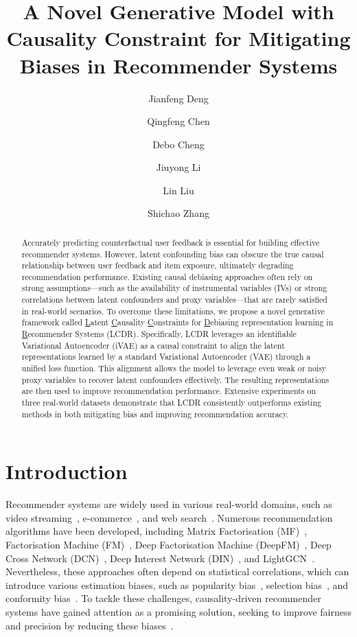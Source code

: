 \documentclass[sigconf]{acmart}
\author{Jianfeng Deng}
\affiliation{%
  \institution{Guangxi University}
  \city{Nanning}
  \country{China}
}
\author{Qingfeng Chen}
\affiliation{%
  \institution{Guangxi University}
  \city{Nanning}
  \country{China}
}
\author{Debo Cheng}
\affiliation{%
  \institution{University of South Australia}
  \city{Adelaide}
  \country{Australia}
}
\author{Jiuyong Li}
\affiliation{%
  \institution{University of South Australia}
  \city{Adelaide}
  \country{Australia}
}
\author{Lin Liu}
\affiliation{%
  \institution{University of South Australia}
  \city{Adelaide}
  \country{Australia}
}
\author{Shichao Zhang}
\affiliation{%
  \institution{Guangxi Normal University}
  \city{Nanning}
  \country{China}
}
\begin{document}
\title{A Novel Generative Model with Causality Constraint for Mitigating Biases in Recommender Systems}


\begin{abstract}
Accurately predicting counterfactual user feedback is essential for building effective recommender systems. However, latent confounding bias can obscure the true causal relationship between user feedback and item exposure, ultimately degrading recommendation performance. Existing causal debiasing approaches often rely on strong assumptions—such as the availability of instrumental variables (IVs) or strong correlations between latent confounders and proxy variables—that are rarely satisfied in real-world scenarios.
To overcome these limitations, we propose a novel generative framework called \underline{L}atent \underline{C}ausality \underline{C}onstraints for \underline{D}ebiasing representation learning in \underline{R}ecommender Systems (LCDR). Specifically, LCDR leverages an identifiable Variational Autoencoder (iVAE) as a causal constraint to align the latent representations learned by a standard Variational Autoencoder (VAE) through a unified loss function. This alignment allows the model to leverage even weak or noisy proxy variables to recover latent confounders effectively. The resulting representations are then used to improve recommendation performance.
Extensive experiments on three real-world datasets demonstrate that LCDR consistently outperforms existing methods in both mitigating bias and improving recommendation accuracy.

\end{abstract}


\maketitle


\section{Introduction}
Recommender systems are widely used in various real-world domains, such as video streaming~\cite{5}, e-commerce~\cite{36}, and web search~\cite{32,li2024ripple}. Numerous recommendation algorithms have been developed, including Matrix Factorisation (MF)~\cite{12}, Factorisation Machine (FM)~\cite{fm}, Deep Factorisation Machine (DeepFM)~\cite{deepfm}, Deep Cross Network (DCN)~\cite{dcn}, Deep Interest Network (DIN)~\cite{din}, and LightGCN~\cite{lightgcn}.
Nevertheless, these approaches often depend on statistical correlations, which can introduce various estimation biases, such as popularity bias~\cite{popularity1}, selection bias~\cite{select1,15}, and conformity bias~\cite{conformity1}.
To tackle these challenges, causality-driven recommender systems have gained attention as a promising solution, seeking to improve fairness and precision by reducing these biases~\cite{21,zhang2025mitigating}.
\end{document}
